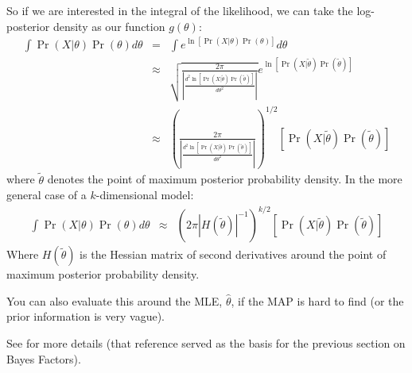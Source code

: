 \documentclass[11pt]{article}
\begin{document}
So if we are interested in the integral of the likelihood, we can take the log-posterior density as our function $g(\theta)$:
\begin{eqnarray*}\nonumber
	\int \Pr(X|\theta)\Pr(\theta) d\theta & = & \int e^{\ln\left[\Pr(X|\theta)\Pr(\theta)\right]}d\theta\\
	& \approx & \sqrt{\frac{2\pi}{\left|\frac{d^2 \ln\left[\Pr(X|\tilde\theta)\Pr(\tilde\theta)\right]}{d \theta^2}\right|}}e^{\ln\left[\Pr(X|\tilde\theta)\Pr(\tilde\theta)\right]}\\
	& \approx & \left({\frac{2\pi}{\left|\frac{d^2 \ln\left[\Pr(X|\tilde\theta)\Pr(\tilde\theta)\right]}{d \theta^2}\right|}}\right)^{1/2}\left[\Pr(X|\tilde\theta)\Pr(\tilde\theta)\right]
\end{eqnarray*}
where $\tilde\theta$ denotes the point of maximum posterior probability density.
In the more general case of a $k$-dimensional model:
\begin{eqnarray*}
	\int \Pr(X|\theta)\Pr(\theta) d\theta & \approx & \left({2\pi}{\left|H(\tilde\theta)\right|^{-1}}\right)^{k/2}\left[\Pr(X|\tilde\theta)\Pr(\tilde\theta)\right]
\end{eqnarray*}
Where $H(\tilde\theta)$ is the Hessian matrix of second derivatives around the point of maximum posterior probability density.

You can also evaluate this around the MLE, $\hat\theta$, if the MAP is hard to find (or the prior information is very vague).

See \cite{KassR1995} for more details (that reference served as the basis for the previous section on Bayes Factors).

\end{document}
